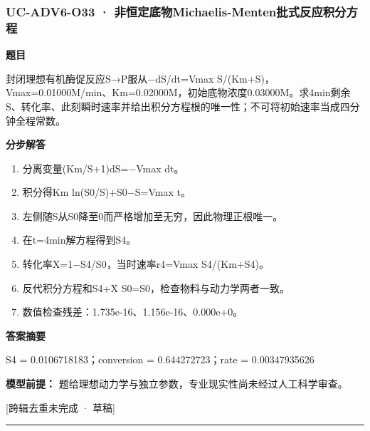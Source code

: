 \documentclass[UTF8,11pt,a4paper]{ctexart}
\begin{document}
\subsubsection*{UC-ADV6-O33 · 非恒定底物Michaelis-Menten批式反应积分方程}
\noindent\textbf{题目}\par
封闭理想有机酶促反应S→P服从−dS/dt=Vmax S/(Km+S)，Vmax=0.01000M/min、Km=0.02000M，初始底物浓度0.03000M。求4min剩余S、转化率、此刻瞬时速率并给出积分方程根的唯一性；不可将初始速率当成四分钟全程常数。\par
\medskip\noindent\textbf{分步解答}
\begin{enumerate}
\item 分离变量(Km/S+1)dS=−Vmax dt。
\item 积分得Km ln(S0/S)+S0−S=Vmax t。
\item 左侧随S从S0降至0而严格增加至无穷，因此物理正根唯一。
\item 在t=4min解方程得到S4。
\item 转化率X=1−S4/S0，当时速率r4=Vmax S4/(Km+S4)。
\item 反代积分方程和S4+X S0=S0，检查物料与动力学两者一致。
\item 数值检查残差：1.735e-16、1.156e-16、0.000e+0。
\end{enumerate}
\noindent\textbf{答案摘要}\par
S4 = 0.0106718183；conversion = 0.644272723；rate = 0.00347935626\par
\noindent\textbf{模型前提：}
题给理想动力学与独立参数，专业现实性尚未经过人工科学审查。\par
\noindent\textcolor{red!65!black}{[跨辑去重未完成 · 草稿]} \par
\medskip\hrule\medskip
{}
\end{document}
